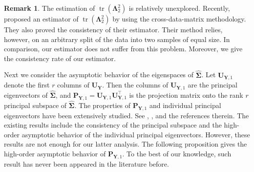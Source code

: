 \documentclass[12pt]{article} %
\DeclareMathOperator{\mytr}{tr}
\newcommand{\bP}{\mathbf{P}}
\newcommand{\bY}{\mathbf{Y}}
\newcommand{\bU}{\mathbf{U}}
\newcommand{\bfsym}[1]{\ensuremath{\boldsymbol{#1}}}
\def\bLambda {\bfsym {\Lambda}}
\def\bSigma {\bfsym {\Sigma}}
\theoremstyle{definition}
\newtheorem{remark}{Remark}
\begin{document}
\begin{remark}
    The estimation of $\mytr(\bLambda_2^2)$ is relatively unexplored.
    Recently, \cite{Aoshima2018} proposed an estimator of $\mytr(\bLambda_2^2)$ by using the cross-data-matrix methodology.
    They also proved the consistency of their estimator.
    Their method relies, however,  on an arbitrary split of the data into two samples of equal size.
    In comparison, our estimator does not suffer from this problem.
    Moreover, we give the consistency rate of our estimator.
\end{remark}

Next we consider the asymptotic behavior of the eigenspaces of $\hat{\bSigma}$.
Let $\bU_{\bY,1}$ denote the first $r$ columns of $\bU_{\bY}$.
Then the columns of $\bU_{\bY,1}$ are the principal eigenvectors of $\hat{\bSigma}$, and $\bP_{\bY,1}=\bU_{\bY,1}\bU_{\bY,1}^\top$ is the projection matrix onto the rank $r$ principal subspace of $\hat{\bSigma}$.
The properties of $\bP_{\bY,1}$ and individual principal eigenvectors have been extensively studied.
See \cite{Cai2015Optimal}, \cite{Shen2016A}, \cite{wang2017As} and the references therein.
The existing results include the consistency of the principal subspace and the high-order asymptotic behavior of the individual principal eigenvectors.
However, these results are not enough for our latter analysis.
The following proposition gives the high-order asymptotic behavior of $\bP_{\bY,1}$.
To the best of our knowledge, such result has never been appeared in the literature before.
\end{document}
